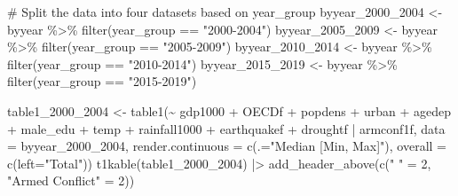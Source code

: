 \documentclass[
  letterpaper,
  DIV=11,
  numbers=noendperiod]{scrartcl}
\newenvironment{Shaded}{\begin{snugshade}}{\end{snugshade}}
\newcommand{\AttributeTok}[1]{\textcolor[rgb]{0.40,0.45,0.13}{#1}}
\newcommand{\CommentTok}[1]{\textcolor[rgb]{0.37,0.37,0.37}{#1}}
\newcommand{\DecValTok}[1]{\textcolor[rgb]{0.68,0.00,0.00}{#1}}
\newcommand{\FunctionTok}[1]{\textcolor[rgb]{0.28,0.35,0.67}{#1}}
\newcommand{\NormalTok}[1]{\textcolor[rgb]{0.00,0.23,0.31}{#1}}
\newcommand{\OtherTok}[1]{\textcolor[rgb]{0.00,0.23,0.31}{#1}}
\newcommand{\SpecialCharTok}[1]{\textcolor[rgb]{0.37,0.37,0.37}{#1}}
\newcommand{\StringTok}[1]{\textcolor[rgb]{0.13,0.47,0.30}{#1}}
\begin{document}
\begin{Shaded}
\begin{Highlighting}[]
\CommentTok{\# Split the data into four datasets based on year\_group}
\NormalTok{byyear\_2000\_2004 }\OtherTok{\textless{}{-}}\NormalTok{ byyear }\SpecialCharTok{\%\textgreater{}\%}
  \FunctionTok{filter}\NormalTok{(year\_group }\SpecialCharTok{==} \StringTok{"2000{-}2004"}\NormalTok{)}
\NormalTok{byyear\_2005\_2009 }\OtherTok{\textless{}{-}}\NormalTok{ byyear }\SpecialCharTok{\%\textgreater{}\%}
  \FunctionTok{filter}\NormalTok{(year\_group }\SpecialCharTok{==} \StringTok{"2005{-}2009"}\NormalTok{)}
\NormalTok{byyear\_2010\_2014 }\OtherTok{\textless{}{-}}\NormalTok{ byyear }\SpecialCharTok{\%\textgreater{}\%}
  \FunctionTok{filter}\NormalTok{(year\_group }\SpecialCharTok{==} \StringTok{"2010{-}2014"}\NormalTok{)}
\NormalTok{byyear\_2015\_2019 }\OtherTok{\textless{}{-}}\NormalTok{ byyear }\SpecialCharTok{\%\textgreater{}\%}
  \FunctionTok{filter}\NormalTok{(year\_group }\SpecialCharTok{==} \StringTok{"2015{-}2019"}\NormalTok{)}
\end{Highlighting}
\end{Shaded}

\begin{Shaded}
\begin{Highlighting}[]
\NormalTok{table1\_2000\_2004 }\OtherTok{\textless{}{-}}
  \FunctionTok{table1}\NormalTok{(}\SpecialCharTok{\textasciitilde{}}\NormalTok{ gdp1000 }\SpecialCharTok{+}\NormalTok{ OECDf }\SpecialCharTok{+}\NormalTok{ popdens }\SpecialCharTok{+}\NormalTok{ urban }\SpecialCharTok{+}\NormalTok{ agedep }\SpecialCharTok{+}\NormalTok{ male\_edu }\SpecialCharTok{+}\NormalTok{ temp }\SpecialCharTok{+}\NormalTok{ rainfall1000 }\SpecialCharTok{+}\NormalTok{ earthquakef }\SpecialCharTok{+}\NormalTok{ droughtf }\SpecialCharTok{|}\NormalTok{ armconf1f,}
       \AttributeTok{data =}\NormalTok{ byyear\_2000\_2004,}
       \AttributeTok{render.continuous =} \FunctionTok{c}\NormalTok{(}\AttributeTok{.=}\StringTok{"Median [Min, Max]"}\NormalTok{),}
       \AttributeTok{overall =} \FunctionTok{c}\NormalTok{(}\AttributeTok{left=}\StringTok{"Total"}\NormalTok{))}
\FunctionTok{t1kable}\NormalTok{(table1\_2000\_2004) }\SpecialCharTok{|\textgreater{}}
  \FunctionTok{add\_header\_above}\NormalTok{(}\FunctionTok{c}\NormalTok{(}\StringTok{" "} \OtherTok{=} \DecValTok{2}\NormalTok{, }\StringTok{"Armed Conflict"} \OtherTok{=} \DecValTok{2}\NormalTok{))}
\end{Highlighting}
\end{Shaded}
\end{document}
